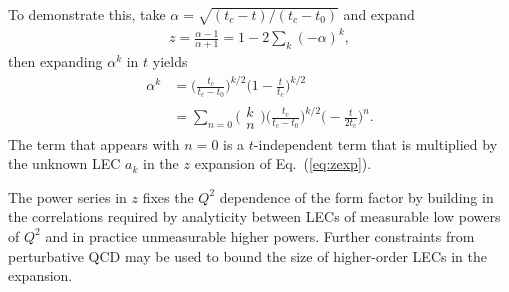 To demonstrate this, take $\alpha=\sqrt{(t_c-t)/(t_c-t_0)}$ and expand
\begin{align}
 z = \frac{\alpha-1}{\alpha+1} = 1 - 2 \sum_k (-\alpha)^k,
\end{align}
 then expanding $\alpha^k$ in $t$ yields
\begin{align}
 \alpha^k &= \biggr(\frac{ t_c}{ t_c -t_0} \biggr)^{k/2} \biggr( 1 -\frac{t}{t_c} \biggr)^{k/2}
 \nonumber\\
 &= \sum_{n=0} \biggr(\begin{array}{c} k \\ n \end{array} \biggr)
 \biggr(\frac{ t_c}{ t_c -t_0} \biggr)^{k/2} \biggr( -\frac{t}{2t_c} \biggr)^{n}.
\end{align}
The term that appears with $n=0$ is a $t$-independent term that is multiplied by
 the unknown LEC $a_k$ in the $z$ expansion of Eq.~(\ref{eq:zexp}).

The power series in $z$ fixes the $Q^2$ dependence of the form factor
 by building in the correlations required by analyticity
 between LECs of measurable low powers of $Q^2$
 and in practice unmeasurable higher powers.
Further constraints from perturbative QCD may be used to bound the size of higher-order LECs
 in the expansion.

